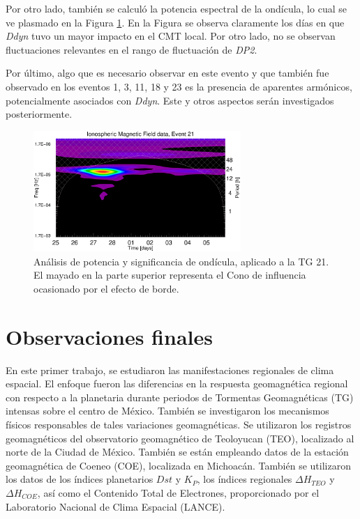 Por otro lado, también se calculó la potencia espectral de la ondícula, lo cual se ve plasmado en la Figura \ref{fig:wavepower}. En la Figura se observa claramente los días en que \emph{Ddyn} tuvo un mayor impacto en el CMT local. Por otro lado, no se observan fluctuaciones relevantes en el rango de fluctuación de \emph{DP2}.
\vspace{1 em}

Por último, algo que es necesario observar en este evento y que también fue observado en los eventos 1, 3, 11, 18 y 23 es la presencia de aparentes armónicos, potencialmente asociados con \emph{Ddyn}. Este y otros aspectos serán investigados posteriormente.


\begin{figure}
    \centering
     \includegraphics[width=0.7\textwidth]{Images/cap2/power/power_2023-02-25.uncut.eps}
      \caption{Análisis de potencia y significancia de ondícula, aplicado a la TG 21. El mayado en la parte superior representa el Cono de influencia ocasionado por el efecto de borde.}
       \label{fig:wavepower}
\end{figure}

\section{Observaciones finales}
En este primer trabajo, se estudiaron las manifestaciones regionales de clima espacial. El enfoque fueron las diferencias en la respuesta geomagnética regional con respecto a la planetaria durante periodos de Tormentas Geomagnéticas (TG) intensas sobre el centro de México. También se investigaron los mecanismos físicos responsables de tales variaciones geomagnéticas. Se utilizaron los registros geomagnéticos del observatorio geomagnético de Teoloyucan (TEO), localizado al norte de la Ciudad de México. También se están empleando datos de la estación geomagnética de Coeneo (COE), localizada en Michoacán. También se utilizaron los datos de los índices planetarios $Dst$ y $K_P$, los índices regionales $\Delta H_{TEO}$ y $\Delta H_{COE}$, así como el Contenido Total de Electrones, proporcionado por el Laboratorio Nacional de Clima Espacial (LANCE).
\vspace{1 em}

